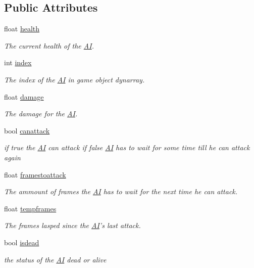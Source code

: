 \subsection*{Public Attributes}
\begin{DoxyCompactItemize}
\item 
float \hyperlink{structoctet_1_1_a_i_a830fe8ab096f675af501eb5a86bf7b00}{health}
\begin{DoxyCompactList}\small\item\em The current health of the \hyperlink{structoctet_1_1_a_i}{A\+I}. \end{DoxyCompactList}\item 
int \hyperlink{structoctet_1_1_a_i_a661a3cbb84347cd57da5a2f45ec2fbdc}{index}
\begin{DoxyCompactList}\small\item\em The index of the \hyperlink{structoctet_1_1_a_i}{A\+I} in game object dynarray. \end{DoxyCompactList}\item 
float \hyperlink{structoctet_1_1_a_i_a1d0e4f22af8d053827acec1f42cf0f41}{damage}
\begin{DoxyCompactList}\small\item\em The damage for the \hyperlink{structoctet_1_1_a_i}{A\+I}. \end{DoxyCompactList}\item 
bool \hyperlink{structoctet_1_1_a_i_a0176ad3aed0864d973ad6ad9cbda02d0}{canattack}
\begin{DoxyCompactList}\small\item\em if true the \hyperlink{structoctet_1_1_a_i}{A\+I} can attack if false \hyperlink{structoctet_1_1_a_i}{A\+I} has to wait for some time till he can attack again \end{DoxyCompactList}\item 
float \hyperlink{structoctet_1_1_a_i_a9c7ae85a59d85e836a4a2137b0f9455f}{framestoattack}
\begin{DoxyCompactList}\small\item\em The ammount of frames the \hyperlink{structoctet_1_1_a_i}{A\+I} has to wait for the next time he can attack. \end{DoxyCompactList}\item 
float \hyperlink{structoctet_1_1_a_i_a9628b67694f7928830f82bac2360b2b7}{tempframes}
\begin{DoxyCompactList}\small\item\em The frames lasped since the \hyperlink{structoctet_1_1_a_i}{A\+I}'s last attack. \end{DoxyCompactList}\item 
bool \hyperlink{structoctet_1_1_a_i_a2938e1f9b22f03013d677b42149d5d96}{isdead}
\begin{DoxyCompactList}\small\item\em the status of the \hyperlink{structoctet_1_1_a_i}{A\+I} dead or alive \end{DoxyCompactList}\end{DoxyCompactItemize}


